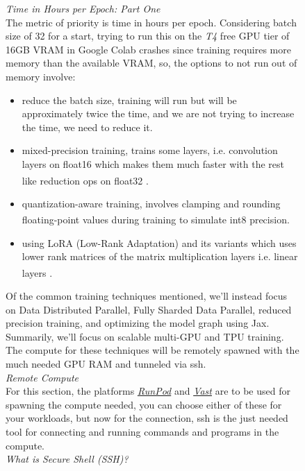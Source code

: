 \documentclass[12pt]{article}
\newcommand{\customtext}[3]{%
    \vspace{#2} %
    \fontsize{13}{8}\textcolor{#1}{\textit{#3}}%
}
\newcommand{\sidecite}[1]{\textsuperscript{\textcolor{blue}{\textbf{\scriptsize#1}}}}
\newcommand{\maincitecount}{\sidecite{\stepcounter{maincite}\themaincite}}
\begin{document}
\begin{figure}[!htb]
    \begin{minipage}[t]{0.65\textwidth}
    \raggedright
    \customtext{xtitle}{0em}{Time in Hours per Epoch: Part One}\\
    The metric of priority is time in hours per epoch. Considering batch 
    size of 32 for a start, trying to run this on the {\it T4} free GPU tier 
    of 16GB VRAM in Google Colab crashes since training requires more memory 
    than the available VRAM, so, the options to not run out of memory involve: 
    \begin{itemize}[left=0pt,topsep=0pt,itemsep=-1ex,parsep=0ex]
        \item reduce the batch size, training will run but will be approximately 
        twice the time, and we are not trying to increase the time, we need to 
        reduce it.
        \item mixed-precision training, trains some layers, i.e. convolution layers 
        on float16 which makes them much faster with the rest like reduction ops on float32
        \maincitecount.
        \item quantization-aware training, involves clamping and rounding floating-point 
        values during training to simulate int8 precision\maincitecount.
        \item using LoRA (Low-Rank Adaptation) and its variants which uses lower rank 
        matrices of the matrix multiplication layers i.e. linear layers \maincitecount. 
    \end{itemize}
Of the common training techniques mentioned, we'll instead focus on 
Data Distributed Parallel, Fully Sharded Data Parallel, reduced precision 
training, and optimizing the model graph using Jax. Summarily, we'll focus on 
scalable multi-GPU and TPU training. The compute for these techniques will 
be remotely spawned with the much needed GPU RAM and tunneled via ssh.
\vspace{1em}\\
\customtext{xtitle}{0em}{Remote Compute}\\
For this section, the platforms {\it \href{https://www.runpod.io}{RunPod}} and 
{\it\href{https://vast.ai}{Vast}} are to be used for spawning the compute needed, 
you can choose either of these for your workloads, but now for the connection, 
ssh is the just needed tool for connecting and running commands and programs in 
the compute.
\vspace{1em}\\
\customtext{xtitle}{0em}{What is Secure Shell (SSH)?}\\

\end{minipage}
\end{figure}
\end{document}
